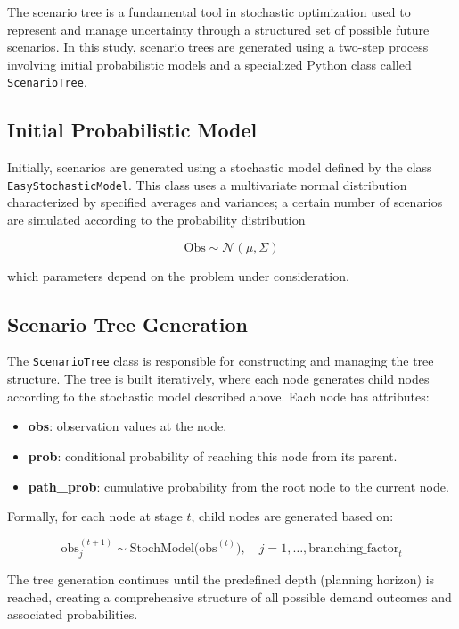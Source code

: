 \documentclass[a4paper,12pt]{article}
\begin{document}
	The scenario tree is a fundamental tool in stochastic optimization used to represent and manage uncertainty through a structured set of possible future scenarios. In this study, scenario trees are generated using a two-step process involving initial probabilistic models and a specialized Python class called \texttt{ScenarioTree}.
	
	\subsection{Initial Probabilistic Model}
	
	Initially, scenarios are generated using a stochastic model defined by the class \texttt{EasyStochasticModel}. This class uses a multivariate normal distribution characterized by specified averages and variances; a certain number of scenarios are simulated according to the probability distribution
	
	\[
	\text{Obs} \sim \mathcal{N}(\mu, \Sigma)
	\]
	
	which parameters depend on the problem under consideration.	
			
	\subsection{Scenario Tree Generation}
	
	The \texttt{ScenarioTree} class is responsible for constructing and managing the tree structure. The tree is built iteratively, where each node generates child nodes according to the stochastic model described above. Each node has attributes:
	
	\begin{itemize}
		\item \textbf{obs}: observation values at the node.
		\item \textbf{prob}: conditional probability of reaching this node from its parent.
		\item \textbf{path\_prob}: cumulative probability from the root node to the current node.
	\end{itemize}
	
	Formally, for each node at stage $t$, child nodes are generated based on:
	
	\[
	\text{obs}^{(t+1)}_j \sim \text{StochModel}\bigl(\text{obs}^{(t)}\bigr), \quad j=1, \dots, \text{branching\_factor}_t
	\]
	
	The tree generation continues until the predefined depth (planning horizon) is reached, creating a comprehensive structure of all possible demand outcomes and associated probabilities.\\
	
\end{document}
